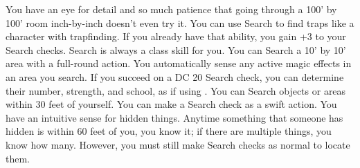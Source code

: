{You have an eye for detail and so much patience that going through a 100' by 100' room inch-by-inch doesn't even try it.}
{You can use Search to find traps like a character with trapfinding. If you already have that ability, you gain +3 to your Search checks. Search is always a class skill for you.}
{You can Search a 10' by 10' area with a full-round action.}
{You automatically sense any active magic effects in an area you search. If you succeed on a DC 20 Search check, you can determine their number, strength, and school, as if using .}
{You can Search objects or areas within 30 feet of yourself. You can make a Search check as a swift action.}
{You have an intuitive sense for hidden things. Anytime something that someone has hidden is within 60 feet of you, you know it; if there are multiple things, you know how many. However, you must still make Search checks as normal to locate them.}